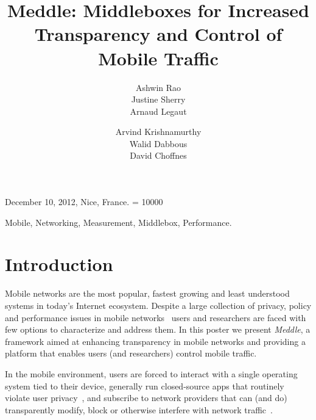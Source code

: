 \documentclass{sig-alternate}
\title{Meddle: Middleboxes for Increased Transparency and Control of
  Mobile Traffic\vspace{-0.2in}}
\author{
\alignauthor
Ashwin Rao\\
\affaddr{INRIA}
\alignauthor        
Justine Sherry\\
\affaddr{UC Berkeley}
\alignauthor
Arnaud Legaut\\
\affaddr{INRIA}
\and
\alignauthor 
Arvind Krishnamurthy\\
\affaddr{University of Washington}
\alignauthor
Walid Dabbous\\
\affaddr{INRIA}
\alignauthor
David Choffnes\\
\affaddr{University of Washington}
}
\newcommand{\meddle}{{\em Meddle}\xspace}
\begin{document}
	
 {December 10, 2012, Nice, France.}
\widowpenalty = 10000

\maketitle



\begin{keywords}
Mobile, Networking, Measurement, Middlebox, Performance.
\end{keywords}

\section{Introduction}

Mobile networks are the most popular, fastest growing and least
understood systems in today's Internet ecosystem. Despite a large
collection of privacy, policy and performance issues in mobile
networks~\cite{enck:taintdroid, hornyack:appfence} users and
researchers are faced with few options to characterize and address
them. In this poster we present \meddle, a framework aimed at
enhancing transparency in mobile networks and providing a platform
that enables users (and researchers) control mobile traffic.

In the mobile environment, users are forced to interact with a single
operating system tied to their device, generally run closed-source
apps that routinely violate user privacy~\cite{hornyack:appfence}, and
subscribe to network providers that can (and do) transparently modify,
block or otherwise interfere with network
traffic~\cite{wang:middleboxes}.  
\end{document}
